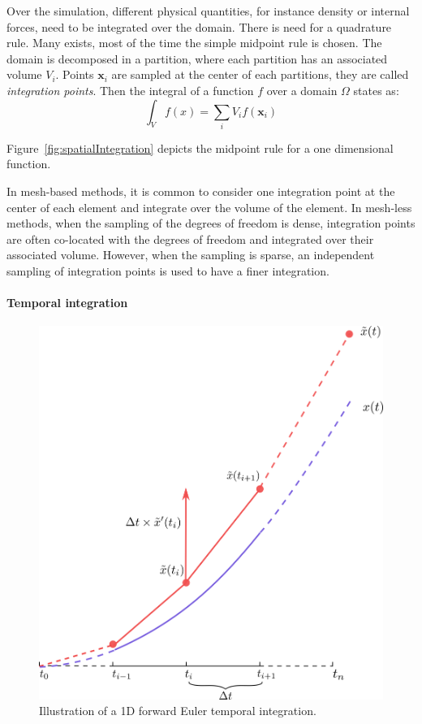 Over the simulation, different physical quantities, for instance density or internal forces, need to be integrated over the domain. There is need for a quadrature rule. Many exists, most of the time the simple midpoint rule is chosen. The domain is decomposed in a partition, where each partition has an associated volume $V_{i}$. Points $\mathbf{x}_{i}$ are sampled at the center of each partitions, they are called \emph{integration points}. Then the integral of a function $f$ over a domain $\Omega$ states as:
\begin{equation}
\label{eq:midpointRule}
\int_{V} f(x) = \sum_{i} V_{i}f(\mathbf{x}_{i})
\end{equation}

Figure~\ref{fig:spatialIntegration} depicts the midpoint rule for a one dimensional function.

In mesh-based methods, it is common to consider one integration point at the center of each element and integrate over the volume of the element.
In mesh-less methods, when the sampling of the degrees of freedom is dense, integration points are often co-located with the degrees of freedom and integrated over their associated volume. However, when the sampling is sparse, an independent sampling of integration points is used to have a finer integration.

\paragraph{Temporal integration}

\begin{figure}[!ht]
\centering
\includegraphics[scale=0.6]{images/continuum_mechanics/timeIntegration.png}
\caption[STAR mechanics: Temporal integration]{\label{fig:timeIntegration} Illustration of a 1D forward Euler temporal integration.}
\end{figure}

